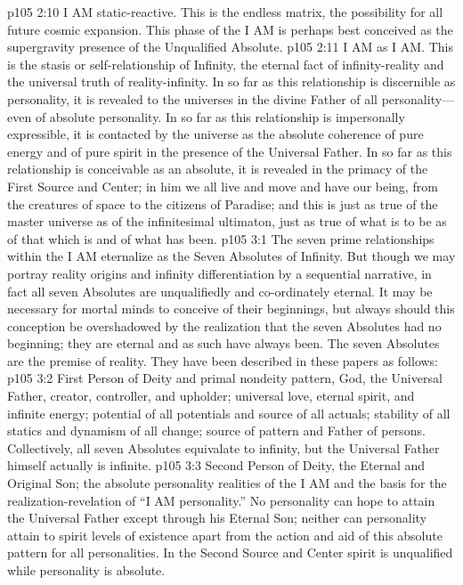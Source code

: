 \pc \vs p105 2:10 \bibnobreakspace {} I AM static\hyp{}reactive. This is the endless matrix, the possibility for all future cosmic expansion. This phase of the I AM is perhaps best conceived as the supergravity presence of the Unqualified Absolute.
\pc \vs p105 2:11 \bibnobreakspace {} I AM as I AM. This is the stasis or self\hyp{}relationship of Infinity, the eternal fact of infinity\hyp{}reality and the universal truth of reality\hyp{}infinity. In so far as this relationship is discernible as personality, it is revealed to the universes in the divine Father of all personality---even of absolute personality. In so far as this relationship is impersonally expressible, it is contacted by the universe as the absolute coherence of pure energy and of pure spirit in the presence of the Universal Father. In so far as this relationship is conceivable as an absolute, it is revealed in the primacy of the First Source and Center; in him we all live and move and have our being, from the creatures of space to the citizens of Paradise; and this is just as true of the master universe as of the infinitesimal ultimaton, just as true of what is to be as of that which is and of what has been.
\vs p105 3:1 The seven prime relationships within the I AM eternalize as the Seven Absolutes of Infinity. But though we may portray reality origins and infinity differentiation by a sequential narrative, in fact all seven Absolutes are unqualifiedly and co\hyp{}ordinately eternal. It may be necessary for mortal minds to conceive of their beginnings, but always should this conception be overshadowed by the realization that the seven Absolutes had no beginning; they are eternal and as such have always been. The seven Absolutes are the premise of reality. They have been described in these papers as follows:
\pc \vs p105 3:2 \bibnobreakspace {} First Person of Deity and primal nondeity pattern, God, the Universal Father, creator, controller, and upholder; universal love, eternal spirit, and infinite energy; potential of all potentials and source of all actuals; stability of all statics and dynamism of all change; source of pattern and Father of persons. Collectively, all seven Absolutes equivalate to infinity, but the Universal Father himself actually is infinite.
\pc \vs p105 3:3 \bibnobreakspace {} Second Person of Deity, the Eternal and Original Son; the absolute personality realities of the I AM and the basis for the realization\hyp{}revelation of “I AM personality.” No personality can hope to attain the Universal Father except through his Eternal Son; neither can personality attain to spirit levels of existence apart from the action and aid of this absolute pattern for all personalities. In the Second Source and Center spirit is unqualified while personality is absolute.
